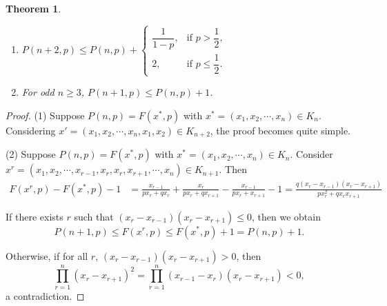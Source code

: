 \documentclass[a4paper,fleqn,numbers]{cas-sc}
\newtheorem{theorem}{Theorem}[section]
\begin{document}
	\begin{theorem}
		\begin{enumerate}
			\item $P(n+2,p)\leq P(n,p)+
			\begin{cases} 
				\dfrac{1}{1-p}, & \text{if } p > \dfrac{1}{2}, \\ 
				2, & \text{if } p \leq \dfrac{1}{2}.
			\end{cases}$
			\item For odd $n\geq 3$, $P(n+1,p)\leq P(n,p)+1$.
		\end{enumerate}
	\end{theorem}
	
	\begin{proof}
		(1) Suppose $P(n,p)=F(x^*,p)$ with $x^*=(x_1,x_2,\cdots,x_n)\in K_n$. Considering $x'=(x_1,x_2,\cdots,x_n,x_1,x_2)\in K_{n+2}$, the proof becomes quite simple. 
		
		
		(2) Suppose $P(n,p)=F(x^*,p)$ with $x^*=(x_1,x_2,\cdots,x_n)\in K_n$. Consider $x^r=(x_1,x_2,\cdots,x_{r-1},x_r,x_r,x_{r+1},\cdots,x_n)\in K_{n+1}$. Then
		\begin{align*}
			F(x^r,p)-F(x^*,p)-1&=\frac{x_{r-1}}{px_r + qx_r}+\frac{x_r}{px_r + qx_{r+1}}-\frac{x_{r-1}}{px_r+ x_{r+1}} -1 = \frac{q(x_r -x_{r-1})(x_r -x_{r+1})}{px_r^2 + qx_r x_{r+1}}
		\end{align*}
		
		If there exists $r$ such that $(x_r -x_{r-1})(x_r -x_{r+1})\leq 0$, then we obtain
		\[
		P(n+1,p)\leq F(x^r,p)\leq F(x^*,p)+1=P(n,p)+1.
		\]
		
		Otherwise, if for all $r$, $(x_r -x_{r-1})(x_r -x_{r+1}) > 0$, then
		\[
		\prod_{r=1}^n (x_r-x_{r+1})^2 = \prod_{r=1}^n (x_{r-1}-x_r)(x_r-x_{r+1}) < 0,
		\]
		a contradiction.
	\end{proof}
	
\end{document}
